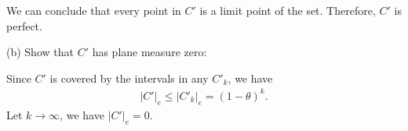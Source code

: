 \documentclass[UTF8,a4paper,10pt]{article}
\begin{document}
\begin{solution}
  We can conclude that every point in \(C'\) is a limit point of the set. Therefore, \(C'\) is perfect.

  \dotfill

  (b) Show that \(C'\) has plane measure
  zero:

  Since \(C'\) is covered by the intervals in any \(C'_k\), we have
  \begin{equation*}
    \begin{aligned}
      \left\lvert C'\right\rvert_e \leq \left\lvert C'_k \right\rvert_e = \left(1-\theta\right)^{k}.
    \end{aligned}
  \end{equation*}
  Let \(k\to\infty\), we have \(\left\lvert C'\right\rvert_e = 0\).

\end{solution}
\end{document}
